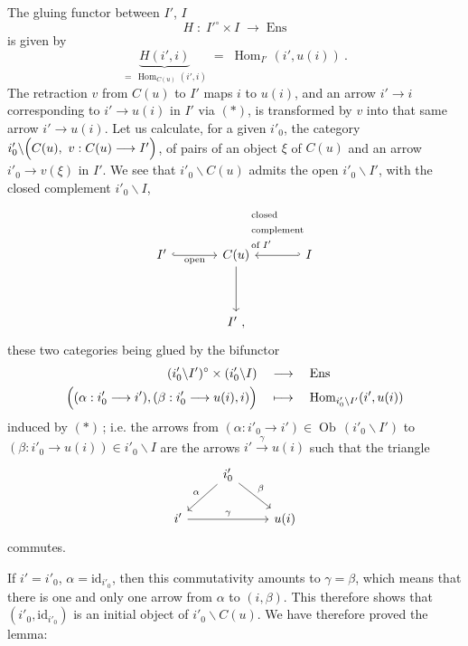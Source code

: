 \documentclass[11pt]{article}
\newcommand{\printedpage}[1]{\marginpar{\footnotesize p.~#1}}
\newcommand{\msp}[1]{\marginpar{\footnotesize [#1]}}
\newcommand{\Ob}{\operatorname{Ob}}
\newcommand{\Hom}{\operatorname{Hom}}
\newcommand{\id}{\mathrm{id}}
\begin{document}
\msp{page 61}
The gluing functor between $I'$, $I$
\[
H \;:\; I'^\circ\times I \;\longrightarrow\; \mathrm{Ens}
\]
is given by
\[
\underbrace{H(i',i)}_{=\,\Hom_{C(u)}(i',i)} \;=\; \Hom_{I'}(i',u(i))\ . \tag*{$(*)$}
\]
The retraction $v$ from $C(u)$ to $I'$ maps $i$ to $u(i)$, and an arrow $i'\longrightarrow i$ corresponding to $i'\longrightarrow u(i)$ in $I'$ via $(*)$, is transformed by $v$ into that same arrow $i'\longrightarrow u(i)$. Let us calculate, %
for a given $i'_0$, the category $i'_0\backslash\Bigl(C(u),\ v : C(u)\longrightarrow I'\Bigr)$, of pairs of an object $\xi$ of $C(u)$ %
and an arrow $i'_0\longrightarrow v(\xi)$ in $I'$. We see that $i'_0\backslash C(u)$ admits the open $i'_0\backslash I'$, with the closed complement $i'_0\backslash I$,
\[
\begin{tikzcd}[column sep=large, row sep=huge]
I' \arrow[r, hook, "\text{open}"'] & C(u) \arrow[d] & I \arrow[l, hook', "\begin{array}{l}\text{closed}\\ \text{complement}\\ \text{of } I'\end{array}"'] \\
 & I'\ ,
\end{tikzcd}
\]
these two categories being glued by the bifunctor
\[
\begin{aligned}
(i'_0\backslash I')^\circ \times (i'_0\backslash I) &\quad\longrightarrow\quad \mathrm{Ens}\\
\Bigl((\alpha : i'_0\longrightarrow i'), (\beta : i'_0\longrightarrow u(i), i)\Bigr) &\quad\longmapsto\quad \Hom_{i'_0\backslash I'}(i',u(i))
\end{aligned}
\]
\printedpage{31}
induced by $(*)$\,; i.e. the arrows from $(\alpha : i'_0\longrightarrow i') \in \Ob\,(i'_0\backslash I')$ to $(\beta : i'_0\longrightarrow u(i)) \in i'_0\backslash I$ are the arrows $i' \xrightarrow{\gamma} u(i)$ such that the triangle
\[
\begin{tikzcd}
 & i'_0 \arrow[dl, "\alpha"'] \arrow[dr, "\beta"] & \\
i' \arrow[rr, "\gamma"] & & u(i)
\end{tikzcd}
\]
commutes.

\msp{page 62}
If $i' = i'_0$, $\alpha = \id_{i'_0}$, then this commutativity amounts to $\gamma = \beta$, which means that there is one and only one arrow from $\alpha$ to $(i,\beta)$. This therefore shows that $(i'_0,\id_{i'_0})$ is an initial object of $i'_0\backslash C(u)$. We have therefore proved the lemma:
\end{document}
